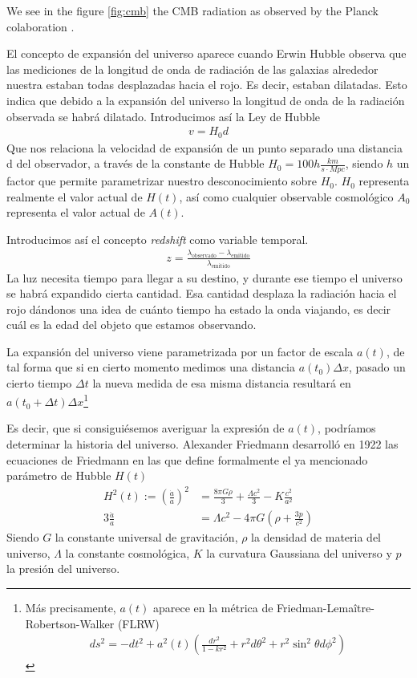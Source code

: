 We see in the figure \ref{fig:cmb} the CMB radiation as observed by the Planck colaboration \cite{Collaboration2018}. 

	
El concepto de expansión del universo aparece cuando Erwin Hubble observa que las mediciones de la longitud de onda de radiación de las galaxias alrededor nuestra estaban todas desplazadas hacia el rojo. Es decir, estaban dilatadas. Esto indica que debido a la expansión del universo la longitud de onda de la radiación observada se habrá dilatado. Introducimos así la Ley de Hubble 
\begin{align}
	v = H_0 d
	\label{eq:ley-hubble}
\end{align}
Que nos relaciona la velocidad de expansión de un punto separado una distancia d del observador, a través de la constante de Hubble $H_0 = 100h \frac{km}{s \cdot Mpc}$, siendo $h$ un factor que permite parametrizar nuestro desconocimiento sobre $H_0$. $H_0$ representa realmente el valor actual de $H(t)$, así como cualquier observable cosmológico $A_0$ representa el valor actual de $A(t)$. 

Introducimos así el concepto \textit{redshift} como variable temporal.
\begin{align}
	z = \frac{\lambda_{\text{observado}} - \lambda_{\text{emitido}}}{\lambda_{\text{emitido}}}
	\label{eq:redshift}
\end{align}
La luz necesita tiempo para llegar a su destino, y durante ese tiempo el universo se habrá expandido cierta cantidad. Esa cantidad desplaza la radiación hacia el rojo dándonos una idea de cuánto tiempo ha estado la onda viajando, es decir cuál es la edad del objeto que estamos observando.

La expansión del universo viene parametrizada por un factor de escala $a(t)$, de tal forma que si en cierto momento medimos una distancia $a(t_0)\Delta x$, pasado un cierto tiempo $\Delta t$ la nueva medida de esa misma distancia resultará en $a(t_0+\Delta t) \Delta x$\footnote{Más precisamente, $a(t)$ aparece en la métrica de Friedman-Lemaître-Robertson-Walker (FLRW) 
\begin{align}
	ds^{2} = -dt ^{2} + a^{2}(t) \left( \frac{dr^{2}}{1-kr^2} + r^2d\theta^2 + r^2 \sin ^2 \theta d\phi^2\right) 
\end{align}}

Es decir, que si consiguiésemos averiguar la expresión de $a(t)$, podríamos determinar la historia del universo. Alexander Friedmann desarrolló en 1922 las ecuaciones de Friedmann en las que define formalmente el ya mencionado parámetro de Hubble $H(t)$
\begin{align}
	H^2(t) := \left( \frac{\dot a}{a} \right)^2 &=  \frac{8\pi G \rho}{3} +\frac{  \Lambda c^2}{3} - K \frac{c^2}{a^2}
	\label{eq:1a-friedmann}\\
	3 \frac{\ddot a}{a} &= \Lambda c^2 - 4\pi G \left( \rho + \frac{3p}{c^2} \right) 
	\label{eq:2a-friedmann}
\end{align}
Siendo  $G$ la constante universal de gravitación, $\rho$ la densidad de materia del universo, $\Lambda$ la constante cosmológica, $K$ la curvatura Gaussiana del universo y  $p$ la presión del universo.


